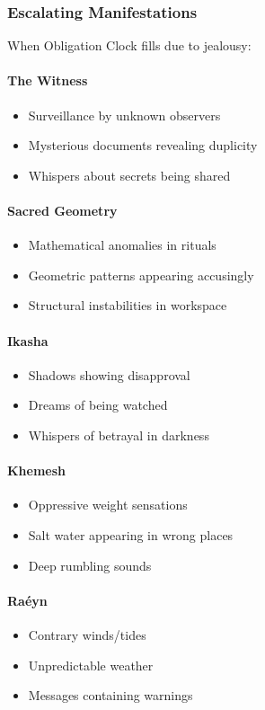 \documentclass[12pt,twoside]{book}
\begin{document}
\subsubsection{Escalating Manifestations}
When Obligation Clock fills due to jealousy:

\paragraph{The Witness}
\begin{itemize}
\item Surveillance by unknown observers
\item Mysterious documents revealing duplicity
\item Whispers about secrets being shared
\end{itemize}

\paragraph{Sacred Geometry}
\begin{itemize}
\item Mathematical anomalies in rituals
\item Geometric patterns appearing accusingly
\item Structural instabilities in workspace
\end{itemize}

\paragraph{Ikasha}
\begin{itemize}
\item Shadows showing disapproval
\item Dreams of being watched
\item Whispers of betrayal in darkness
\end{itemize}

\paragraph{Khemesh}
\begin{itemize}
\item Oppressive weight sensations
\item Salt water appearing in wrong places
\item Deep rumbling sounds
\end{itemize}

\paragraph{Raéyn}
\begin{itemize}
\item Contrary winds/tides
\item Unpredictable weather
\item Messages containing warnings
\end{itemize}
\end{document}
